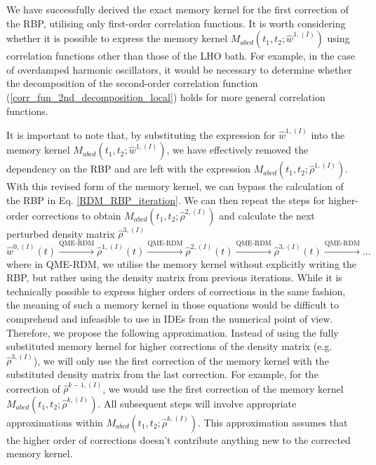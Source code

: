 We have successfully derived the exact memory kernel for the first correction of the RBP, utilising only first-order correlation functions. It is worth considering whether it is possible to express the memory kernel $M_{abcd}(t_1, t_2; \hat{w}^{1,(I)})$ using correlation functions other than those of the LHO bath. For example, in the case of overdamped harmonic oscillators, it would be necessary to determine whether the decomposition of the second-order correlation function (\ref{corr_fun_2nd_decomposition_local}) holds for more general correlation functions.

It is important to note that, by substituting the expression for $\hat{w}^{1,(I)}$ into the memory kernel $M_{abcd}(t_1, t_2; \hat{w}^{1,(I)})$, we have effectively removed the dependency on the RBP and are left with the expression $M_{abcd}(t_1, t_2; \hat{\rho}^{1,(I)})$. With this revised form of the memory kernel, we can bypass the calculation of the RBP in Eq. \ref{RDM_RBP_iteration}. We can then repeat the steps for higher-order corrections to obtain $M_{abcd}(t_1, t_2; \hat{\rho}^{2,(I)})$ and calculate the next perturbed density matrix $\hat{\rho}^{3,(I)}$
\begin{equation}
\label{RDM_RBP_iteration_rewritten}
    \hat{w}^{0,(I)}(t) \overset{\text{QME-RDM}}{\longrightarrow} \hat{\rho}^{1,(I)}(t) \overset{\text{QME-RDM}}{\longrightarrow} \hat{\rho}^{2,(I)}(t) \overset{\text{QME-RDM}}{\longrightarrow} \hat{\rho}^{3,(I)}(t) \overset{\text{QME-RDM}}{\longrightarrow} \ldots
\end{equation}
where in QME-RDM, we utilise the memory kernel without explicitly writing the RBP, but rather using the density matrix from previous iterations. While it is technically possible to express higher orders of corrections in the same fashion, the meaning of such a memory kernel in those equations would be difficult to comprehend and infeasible to use in IDEs from the numerical point of view. Therefore, we propose the following approximation. Instead of using the fully substituted memory kernel for higher corrections of the density matrix (e.g. $\hat{\rho}^{3,(I)}$), we will only use the first correction of the memory kernel with the substituted density matrix from the last correction. For example, for the correction of $\hat{\rho}^{k-1,(I)}$, we would use the first correction of the memory kernel $M_{abcd}(t_1, t_2; \hat{\rho}^{k,(I)})$. All subsequent steps will involve appropriate approximations within $M_{abcd}(t_1, t_2; \hat{\rho}^{k,(I)})$. This approximation assumes that the higher order of corrections doesn't contribute anything new to the corrected memory kernel.

